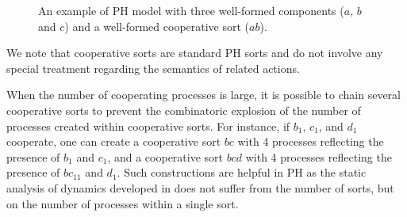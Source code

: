 \begin{figure}
  \centering
  \label{fig:ph-livelock}
  \caption{An example of PH model with three well-formed components ($a$, $b$ and $c$) and a well-formed cooperative sort ($ab$).}
\end{figure}

We note that cooperative sorts are standard PH sorts and do not involve any
special treatment regarding the semantics of related actions.

When the number of cooperating processes is large, it is possible to chain several cooperative sorts
to prevent the combinatoric explosion of the number of processes created within cooperative sorts.
For instance, if $b_1$, $c_1$, and $d_1$ cooperate, one can create a cooperative sort $bc$ with 4
processes reflecting the presence of $b_1$ and $c_1$, and a cooperative sort $bcd$ with 4 processes
reflecting the presence of $bc_{11}$ and $d_1$.  Such constructions are helpful in PH
as the static analysis of dynamics developed in \cite{PMR12-MSCS} does not suffer from the number of
sorts, but on the number of processes within a single sort.

